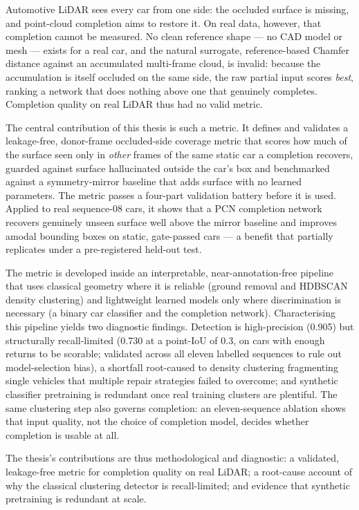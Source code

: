 Automotive LiDAR sees every car from one side: the occluded surface is missing, and
point-cloud completion aims to restore it. On real data, however, that completion cannot
be measured. No clean reference shape --- no CAD model or mesh --- exists for a real car,
and the natural surrogate, reference-based Chamfer distance against an accumulated
multi-frame cloud, is invalid: because the accumulation is itself occluded on the same
side, the raw partial input scores \emph{best}, ranking a network that does nothing above
one that genuinely completes. Completion quality on real LiDAR thus had no valid metric.

The central contribution of this thesis is such a metric. It defines and validates a
leakage-free, donor-frame occluded-side coverage metric that scores how much of the
surface seen only in \emph{other} frames of the same static car a completion recovers,
guarded against surface hallucinated outside the car's box and benchmarked against a
symmetry-mirror baseline that adds surface with no learned parameters. The metric passes
a four-part validation battery before it is used. Applied to real sequence-08 cars, it
shows that a PCN completion network recovers genuinely unseen surface well above the
mirror baseline and improves amodal bounding boxes on static, gate-passed cars --- a
benefit that partially replicates under a pre-registered held-out test.

The metric is developed inside an interpretable, near-annotation-free pipeline that uses
classical geometry where it is reliable (ground removal and HDBSCAN density clustering)
and lightweight learned models only where discrimination is necessary (a binary car
classifier and the completion network). Characterising this pipeline yields two
diagnostic findings. Detection is high-precision (\num{0.905}) but structurally
recall-limited (\num{0.730} at a point-IoU of \num{0.3}, on cars with enough returns to be
scorable; validated across all eleven labelled sequences to rule out model-selection
bias), a shortfall root-caused to density clustering fragmenting single vehicles that
multiple repair strategies failed to overcome; and synthetic classifier pretraining is
redundant once real training clusters are plentiful. The same clustering step also governs
completion: an eleven-sequence ablation shows that input quality, not the choice of
completion model, decides whether completion is usable at all.

The thesis's contributions are thus methodological and diagnostic: a validated,
leakage-free metric for completion quality on real LiDAR; a root-cause account of why the
classical clustering detector is recall-limited; and evidence that synthetic pretraining
is redundant at scale.
